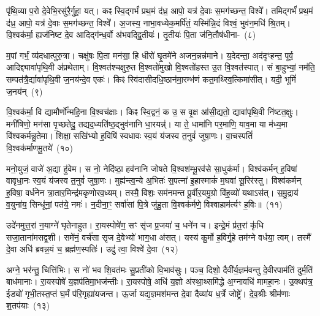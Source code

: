 पृ॑थि॒व्या प॒रो दे॒वेभि॒रसु॑रै॒र्गुहा॒ यत्। कꣴ स्वि॒द्गर्भं॑ प्रथ॒मं द॑ध्र॒ आपो॒ यत्र॑ दे॒वाः स॒मग॑च्छन्त॒ विश्वे᳚। तमिद्गर्भं॑ प्रथ॒मं द॑ध्र॒ आपो॒ यत्र॑ दे॒वाः स॒मग॑च्छन्त॒ विश्वे᳚। अ॒जस्य॒ नाभा॒वध्येक॒मर्पि॑तं॒ यस्मि॑न्नि॒दं विश्वं॒ भुव॑न॒\-मधि॑ श्रि॒तम्। वि॒श्वक॑र्मा॒ ह्यज॑निष्ट दे॒व आदिद्ग॑न्ध॒र्वो अ॑भवद्द्वि॒तीयः॑। तृ॒तीयः॑ पि॒ता ज॑नि॒तौष॑धीना-~(८)\ip

म॒पां गर्भं॒ व्य॑दधात्पुरु॒त्रा। चक्षु॑षः पि॒ता मन॑सा॒ हि धीरो॑ घृ॒तमे॑ने अजन॒न्नन्न॑माने। य॒देदन्ता॒ अद॑दृꣳहन्त॒ पूर्व॒ आदिद्द्यावा॑\-पृथि॒वी अ॑प्रथेताम्। वि॒श्वत॑श्चक्षुरु॒त वि॒श्वतो॑मुखो वि॒श्वतो॑हस्त उ॒त वि॒श्वत॑स्पात्। सं बा॒हुभ्यां॒ नम॑ति॒ सम्पत॑त्रै॒र्द्यावा॑\-पृथि॒वी ज॒नय॑न्दे॒व एकः॑। किꣴ स्वि॑दासीदधि॒ष्ठान॑मा॒रम्भ॑णं कत॒मथ्स्वि॒त्किमा॑सीत्। यदी॒ भूमिं॑ ज॒नय॑न्~(९)\ip

वि॒श्वक॑र्मा॒ वि द्यामौर्णो᳚न्महि॒ना वि॒श्वच॑क्षाः। किꣴ स्वि॒द्वनं॒ क उ॒ स वृ॒क्ष आ॑सी॒द्यतो॒ द्यावा॑\-पृथि॒वी नि॑ष्टत॒क्षुः। मनी॑षिणो॒ मन॑सा पृ॒च्छतेदु॒ तद्यद॒ध्यति॑ष्ठ॒द्भुव॑नानि धा॒रयन्न्॑। या ते॒ धामा॑नि पर॒माणि॒ याव॒मा या म॑ध्य॒मा वि॑श्वकर्मन्नु॒तेमा। शिक्षा॒ सखि॑भ्यो ह॒विषि॑ स्वधावः स्व॒यं य॑जस्व त॒नुवं॑ जुषा॒णः। वा॒चस्पतिं॑ वि॒श्वक॑र्माणमू॒तये॑~(१०)\ip

मनो॒युजं॒ वाजे॑ अ॒द्या हु॑वेम। स नो॒ नेदि॑ष्ठा॒ हव॑नानि जोषते वि॒श्वश॑म्भू॒रव॑से सा॒धुक॑र्मा। विश्व॑कर्मन् ह॒विषा॑ वावृधा॒नः स्व॒यं य॑जस्व त॒नुवं॑ जुषा॒णः। मुह्य॑न्त्व॒न्ये अ॒भितः॑ स॒पत्ना॑ इ॒हास्माकं॑ म॒घवा॑ सू॒रिर॑स्तु। विश्व॑कर्मन् ह॒विषा॒ वर्ध॑नेन त्रा॒तार॒मिन्द्र॑मकृणोरव॒ध्यम्। तस्मै॒ विशः॒ सम॑नमन्त पू॒र्वीर॒यमु॒ग्रो वि॑ह॒व्यो॑ यथा\-ऽ\-स॑त्। स॒मु॒द्राय॑ व॒युना॑य॒ सिन्धू॑नां॒ पत॑ये॒ नमः॑। न॒दीना॒ꣳ॒ सर्वा॑सां पि॒त्रे जु॑हु॒ता वि॒श्वक॑र्मणे॒ विश्वाहाम॑र्त्यꣳ ह॒विः॥~(११)\ip

{\anuvakamend[{ज॒जानै॒नौष॑धीनां॒ भूमिं॑ ज॒नय॑न्नू॒तये॒ नमो॒ नव॑ च}]}

उदे॑नमुत्त॒रां न॒याग्ने॑ घृतेनाहुत। रा॒यस्पोषे॑ण॒ सꣳ सृ॑ज प्र॒जया॑ च॒ धने॑न च। इन्द्रे॒मं प्र॑त॒रां कृ॑धि सजा॒ताना॑मसद्व॒शी। समे॑नं॒ वर्च॑सा सृज दे॒वेभ्यो॑ भाग॒धा अ॑सत्। यस्य॑ कु॒र्मो ह॒विर्गृ॒हे तम॑ग्ने वर्धया॒ त्वम्। तस्मै॑ दे॒वा अधि॑ ब्रवन्न॒यं च॒ ब्रह्म॑ण॒स्पतिः॑। उदु॑ त्वा॒ विश्वे॑ दे॒वा~(१२)\ip

अग्ने॒ भर॑न्तु॒ चित्ति॑भिः। स नो॑ भव शि॒वत॑मः सु॒प्रती॑को वि॒भाव॑सुः। पञ्च॒ दिशो॒ दैवी᳚र्य॒ज्ञम॑वन्तु दे॒वीरपाम॑तिं दुर्म॒तिं बाध॑मानाः। रा॒यस्पोषे॑ य॒ज्ञप॑तिमा॒भज॑न्तीः। रा॒यस्पोषे॒ अधि॑ य॒ज्ञो अ॑स्था॒थ्समि॑द्धे अ॒ग्नावधि॑ मामहा॒नः। उ॒क्थप॑त्र॒ ईड्यो॑ गृभी॒तस्त॒प्तं घ॒र्मं प॑रि॒गृह्या॑यजन्त। ऊ॒र्जा यद्य॒ज्ञमश॑मन्त दे॒वा दैव्या॑य ध॒र्त्रे जोष्ट्रे᳚। दे॒व॒श्रीः श्रीम॑णाः श॒तप॑याः~(१३)\ip

